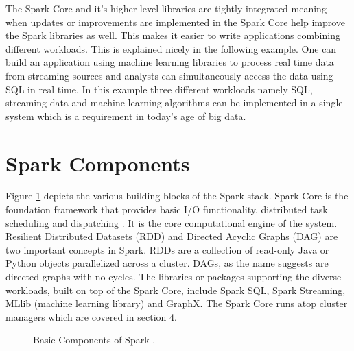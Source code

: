 \documentclass[9pt,twocolumn,twoside]{../../styles/osajnl}
\begin{document}
The Spark Core and it's higher level libraries are tightly integrated
meaning when updates or improvements are implemented in the Spark Core
help improve the Spark libraries as well. This makes it easier to
write applications combining different workloads. This is explained
nicely in the following example. One can build an application using
machine learning libraries to process real time data from streaming
sources and analysts can simultaneously access the data using SQL in
real time.  In this example three different workloads namely SQL,
streaming data and machine learning algorithms can be implemented in a
single system which is a requirement in today’s age of big data.

\section{Spark Components}
Figure \ref{fig:spark-stack} depicts the various building blocks of
the Spark stack. Spark Core is the foundation framework that provides
basic I/O functionality, distributed task scheduling and dispatching
\cite{article-spark-1}. It is the core computational engine of the
system. Resilient Distributed Datasets (RDD) and Directed Acyclic
Graphs (DAG) are two important concepts in Spark. RDDs are a
collection of read-only Java or Python objects parallelized across a
cluster. DAGs, as the name suggests are directed graphs with no
cycles. The libraries or packages supporting the diverse workloads,
built on top of the Spark Core, include Spark SQL, Spark Streaming,
MLlib (machine learning library) and GraphX. The Spark Core runs atop
cluster managers which are covered in section 4.

\begin{figure}[htbp]
\centering
{}
\caption{Basic Components of Spark \cite{book-spark}.}
\label{fig:spark-stack}
\end{figure}
\end{document}
